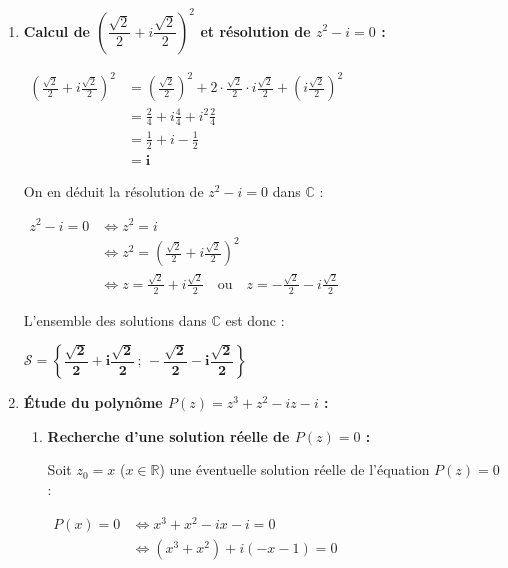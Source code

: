 \documentclass[12pt,a4paper]{article}
\begin{document}
\begin{enumerate}
    \item \textbf{Calcul de $\left(\dfrac{\sqrt{2}}{2} + i\dfrac{\sqrt{2}}{2}\right)^{2}$ et résolution de $z^2 - i = 0$ :}
    
    $
    \begin{aligned}
        \left(\frac{\sqrt{2}}{2} + i\frac{\sqrt{2}}{2}\right)^2 &= \left(\frac{\sqrt{2}}{2}\right)^2 + 2 \cdot \frac{\sqrt{2}}{2} \cdot i\frac{\sqrt{2}}{2} + \left(i\frac{\sqrt{2}}{2}\right)^2\\
        &= \frac{2}{4} + i\frac{4}{4} + i^2\frac{2}{4}\\
        &= \frac{1}{2} + i - \frac{1}{2}\\
        &= \mathbf{i}
    \end{aligned}
    $
    
    On en déduit la résolution de $z^2 - i = 0$ dans $\mathbb{C}$ :
    
    $
    \begin{aligned}
        z^2 - i = 0 &\iff z^2 = i\\
        &\iff z^2 = \left(\frac{\sqrt{2}}{2} + i\frac{\sqrt{2}}{2}\right)^2\\
        &\iff z = \frac{\sqrt{2}}{2} + i\frac{\sqrt{2}}{2} \quad \text{ou} \quad z = -\frac{\sqrt{2}}{2} - i\frac{\sqrt{2}}{2}
    \end{aligned}
    $
    
    L'ensemble des solutions dans $\mathbb{C}$ est donc :
    
    $
    \mathcal{S} = \left\{\mathbf{\dfrac{\sqrt{2}}{2} + i\dfrac{\sqrt{2}}{2} \,;\, -\dfrac{\sqrt{2}}{2} - i\dfrac{\sqrt{2}}{2}}\right\}
    $

    \item \textbf{Étude du polynôme $P(z) = z^3 + z^2 - iz - i$ :}
    
    \begin{enumerate}
        \item \textbf{Recherche d'une solution réelle de $P(z) = 0$ :}
        
        Soit $z_0 = x$ ($x \in \mathbb{R}$) une éventuelle solution réelle de l'équation $P(z) = 0$ :
        
        $
        \begin{aligned}
            P(x) = 0 &\iff x^3 + x^2 - ix - i = 0\\
            &\iff (x^3 + x^2) + i(-x - 1) = 0
        \end{aligned}
        $
        

\end{enumerate}
\end{enumerate}
\end{document}
